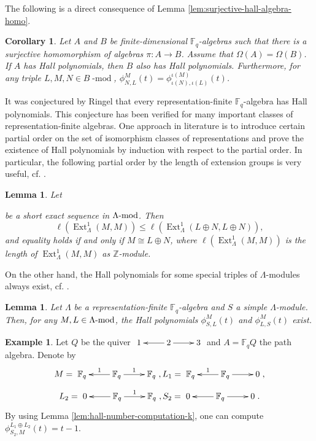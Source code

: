 \documentclass[12pt]{amsart}
\newtheorem{lemma}[theorem]{Lemma}
\newtheorem{corollary}[theorem]{Corollary}
\theoremstyle{remark}
\theoremstyle{definition}
\newtheorem{example}[theorem]{Example}
\numberwithin{equation}{section}
\newcommand{\Ext}{\operatorname{Ext}\nolimits}
\newcommand{\opname}{\operatorname}
\begin{document}
The following is  a direct consequence of Lemma \ref{lem:surjective-hall-algebra-homo}.
\begin{corollary}\label{cor:hall-polynomial-factor-alg}
    Let $A$ and $B$ be finite-dimensional $\mathbb{F}_q$-algebras such that there is a surjective homomorphism of algebras $\pi:A\to B$. Assume that $\Omega(A)=\Omega(B)$. If $A$ has Hall polynomials, then $B$ also has Hall polynomials. Furthermore, for any triple $L,M,N\in B\text{-$\opname{mod}$}$, $\phi_{N,L}^M(t)=\phi_{\iota(N),\iota(L)}^{\iota(M)}(t)$.
\end{corollary}

It was conjectured by Ringel \cite{Ringel92} that every representation-finite $\mathbb{F}_q$-algebra has Hall polynomials. This conjecture has been verified for many important classes of representation-finite algebras. One approach in literature is to introduce certain partial order on the set of isomorphism classes of representations and prove the existence of Hall polynomials by induction with respect to the partial order. In particular, the following partial order by the length of extension groups is very useful, cf. \cite{GP97}.
\begin{lemma}\label{lem:order-relation-k}
  Let   
be a short exact sequence in $\Lambda{\text{-{\rm mod}}}$. Then 
\[
    \ell{(\Ext^1_\Lambda(M,M))}
    \leq \ell{(\Ext^1_\Lambda(L\oplus N,L\oplus N))},
\]
and equality holds if
and only if $M\cong L\oplus N $, where  $\ell{(\Ext^1_\Lambda(M,M))}$ is the length of $\Ext^1_\Lambda(M,M)$ as
$\mathbb{Z}$-module.
\end{lemma}

On the other hand, the Hall polynomials for some special triples of $\Lambda$-modules always exist, cf. \cite[Corollary 2.2.1]{P97}.
\begin{lemma}
    Let $\Lambda$ be a representation-finite $\mathbb{F}_q$-algebra and $S$ a simple $\Lambda$-module. Then, for any $M,L\in \Lambda{\text{-{\rm mod}}}$, the Hall polynomials $\phi_{S,L}^M(t)$ and $\phi_{L,S}^M(t)$ exist.
\end{lemma}
\begin{example}
    Let $Q$ be  the quiver $\xymatrix{1&2\ar[l]\ar[r]&3}$ and $A=\mathbb{F}_qQ$ the path algebra.  Denote by \[M=\xymatrix{\mathbb{F}_q&\mathbb{F}_q\ar[r]^1\ar[l]_1&\mathbb{F}_q},L_1=\xymatrix{\mathbb{F}_q&\mathbb{F}_q\ar[l]_1\ar[r]&0},\] 
    \[L_2=\xymatrix{0&\mathbb{F}_q\ar[l]\ar[r]^1&\mathbb{F}_q},S_2=\xymatrix{0&\mathbb{F}_q\ar[r]\ar[l]&0}.
    \] By using Lemma \ref{lem:hall-number-computation-k}, one can compute $\phi_{S_2,M}^{L_1\oplus L_2}(t)=t-1$.
\end{example}
\end{document}
